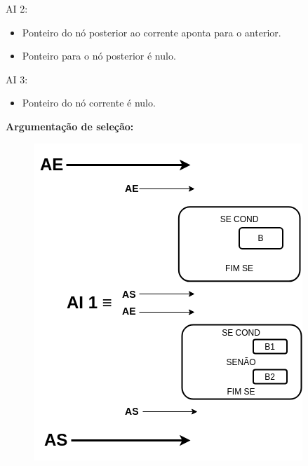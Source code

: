 \documentclass[
	12pt, %
]{fphw}
\begin{document}
\begin{doublespace}
\begin{itemize}
    \end{itemize}

    AI 2:

    \begin{itemize}

        \item Ponteiro do nó posterior ao corrente aponta para o anterior.
        \item Ponteiro para o nó posterior é nulo.

    \end{itemize}

    AI 3:

    \begin{itemize}

        \item Ponteiro do nó corrente é nulo.

    \end{itemize}

    \pagebreak

    \textbf{Argumentação de seleção:}

    \begin{figure}[ht]
        \begin{minipage}{0.45\linewidth}
            \includegraphics[width=\textwidth]{argumentacaodeselecao.png}
        \end{minipage}
        \begin{minipage}{0.5\linewidth}


\end{minipage}
\end{figure}
\end{doublespace}
\end{document}
